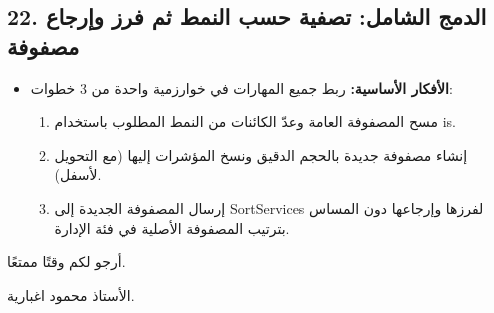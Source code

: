 \documentclass[14pt]{extarticle}
\begin{document}
\filbreak
\subsection*{22. الدمج الشامل: تصفية حسب النمط ثم فرز وإرجاع مصفوفة}
\begin{itemize}[itemsep=0.3em]
    \item \textbf{الأفكار الأساسية:} ربط جميع المهارات في خوارزمية واحدة من 3 خطوات:
    \begin{enumerate}
        \item مسح المصفوفة العامة وعدّ الكائنات من النمط المطلوب باستخدام \textenglish{is}.
        \item إنشاء مصفوفة جديدة بالحجم الدقيق ونسخ المؤشرات إليها (مع التحويل لأسفل).
        \item إرسال المصفوفة الجديدة إلى \textenglish{SortServices} لفرزها وإرجاعها دون المساس بترتيب المصفوفة الأصلية في فئة الإدارة.
    \end{enumerate}
\end{itemize}

\vspace{0.8cm}
\begin{flushleft}
أرجو لكم وقتًا ممتعًا.

الأستاذ محمود اغبارية.
\end{flushleft}
\end{document}
